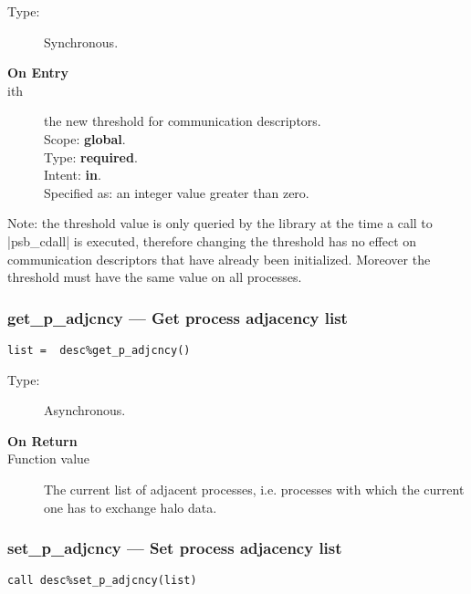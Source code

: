 \begin{description}
\item[Type:] Synchronous.
\item[\bf On Entry]
\item[ith] the new threshold for communication descriptors.\\
Scope: {\bf global}.\\
Type: {\bf required}.\\
Intent: {\bf in}.\\
Specified as: an integer value greater than zero.
\end{description}
Note: the threshold value is only queried by the library at the time a
call to \fortinline|psb_cdall| is executed, therefore changing the threshold
has no effect on communication descriptors that have already been
initialized. Moreover the threshold must have the same value on all
processes. 


\subsubsection{get\_p\_adjcncy --- Get process adjacency list}

\begin{verbatim}
list =  desc%get_p_adjcncy()
\end{verbatim}

\begin{description}
\item[Type:] Asynchronous.
\item[\bf On Return]
\item[Function value] The current list of adjacent processes,
  i.e. processes with which the current one has to exchange halo
  data. 

\end{description}

\subsubsection{set\_p\_adjcncy --- Set process adjacency list}

\begin{verbatim}
call desc%set_p_adjcncy(list)
\end{verbatim}

